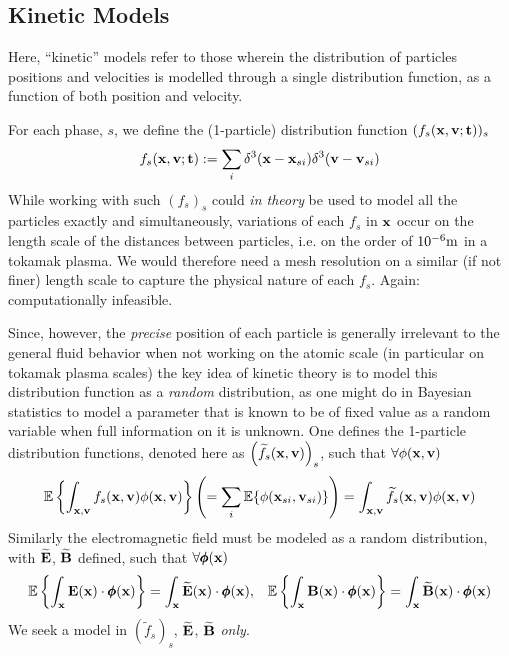 \subsection*{Kinetic Models}
    \begin{definition}
        Here, ``kinetic'' models refer to those wherein the distribution of particles positions and velocities is modelled through a single distribution function, as a function of both position and velocity.
    \end{definition}
    For each phase, $s$, we define the (1-particle) distribution function $(f_{s}(\mathbf{x}, \mathbf{v}; \mathbf{t}))_{s}$
    \begin{equation}
        f_{s}(\mathbf{x}, \mathbf{v}; \mathbf{t})  :=  \sum_{i}\delta^{3}(\mathbf{x} - \mathbf{x}_{si})\delta^{3}(\mathbf{v} - \mathbf{v}_{si})
    \end{equation}
    While working with such $(f_{s})_{s}$ could \emph{in theory} be used to model all the particles exactly and simultaneously, variations of each $f_{s}$ in $\mathbf{x}$ occur on the length scale of the distances between particles, i.e. on the order of $10^{- 6}\mathrm{m}$ in a tokamak plasma. We would therefore need a mesh resolution on a similar (if not finer) length scale to capture the physical nature of each $f_{s}$. Again: computationally infeasible.

    Since, however, the \emph{precise} position of each particle is generally irrelevant to the general fluid behavior when not working on the atomic scale (in particular on tokamak plasma scales) the key idea of kinetic theory is to model this distribution function as a \emph{random} distribution, as one might do in Bayesian statistics to model a parameter that is known to be of fixed value as a random variable when full information on it is unknown. One defines the 1-particle distribution functions, denoted here as $\left(\widetilde{f}_{s}(\mathbf{x}, \mathbf{v})\right)_{s}$, such that $\forall \phi(\mathbf{x}, \mathbf{v})$
    \begin{equation}
        \mathbb{E}\left\{\int_{\mathbf{x}, \mathbf{v}}f_{s}(\mathbf{x}, \mathbf{v})\phi(\mathbf{x}, \mathbf{v})\right\}
        \left(=  \sum_{i}\mathbb{E}\{\phi(\mathbf{x}_{si}, \mathbf{v}_{si})\}\right)
        =  \int_{\mathbf{x}, \mathbf{v}}\widetilde{f}_{s}(\mathbf{x}, \mathbf{v})\phi(\mathbf{x}, \mathbf{v})
    \end{equation}
    Similarly the electromagnetic field must be modeled as a random distribution, with $\widetilde{\mathbf{E}}$, $\widetilde{\mathbf{B}}$ defined, such that $\forall \pmb{\mathsf{\phi}}(\mathbf{x})$
    \begin{align}
        \mathbb{E}\left\{\int_{\mathbf{x}}\mathbf{E}(\mathbf{x})\cdot\pmb{\mathsf{\phi}}(\mathbf{x})\right\}  =  \int_{\mathbf{x}}\widetilde{\mathbf{E}}(\mathbf{x})\cdot\pmb{\mathsf{\phi}}(\mathbf{x}),  && 
        \mathbb{E}\left\{\int_{\mathbf{x}}\mathbf{B}(\mathbf{x})\cdot\pmb{\mathsf{\phi}}(\mathbf{x})\right\}  =  \int_{\mathbf{x}}\widetilde{\mathbf{B}}(\mathbf{x})\cdot\pmb{\mathsf{\phi}}(\mathbf{x})
    \end{align}
    We seek a model in $\left(\widetilde{f}_{s}\right)_{s}$, $\widetilde{\mathbf{E}}$, $\widetilde{\mathbf{B}}$ \emph{only}.

